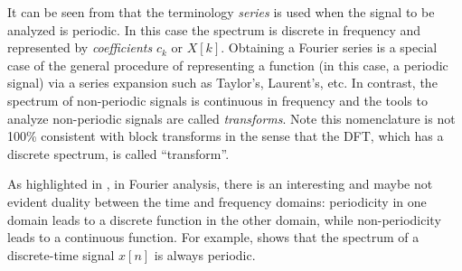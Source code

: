 
It can be seen from  that the terminology \emph{series} is used when the signal to be analyzed is periodic. In this case the spectrum is discrete in frequency and represented by \emph{coefficients} $c_k$ or $X[k]$. Obtaining a Fourier series is a special case of the general procedure of representing a function (in this case, a periodic signal) via a series expansion such as Taylor's, Laurent's, etc. In contrast, the spectrum of non-periodic signals is continuous in frequency and the tools to analyze non-periodic signals are called \emph{transforms}. Note this nomenclature is not 100\% consistent with block transforms in the sense that the DFT, which has a discrete spectrum, is called ``transform''.

As highlighted in , in Fourier analysis, there is an interesting and maybe not evident duality between the time and frequency domains: periodicity in one domain leads to a discrete function in the other domain, while  non-periodicity leads to a continuous function. For example,  shows that the spectrum of a discrete-time signal $x[n]$ is always periodic.


